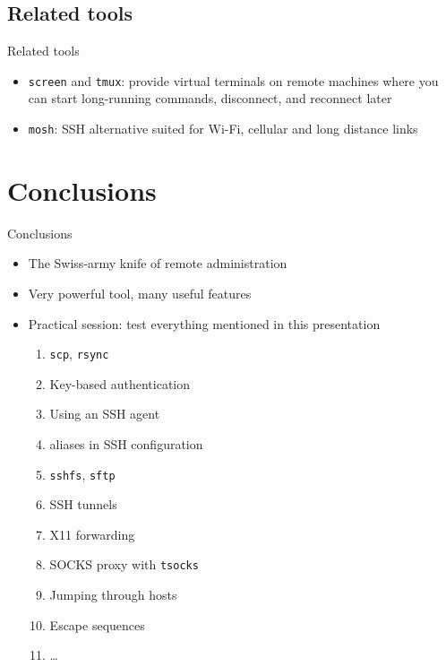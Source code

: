 \documentclass[11pt,final,usepdftitle=false]{beamer}
\begin{document}
\subsection{Related tools}
\begin{frame}{Related tools}
\begin{itemize}
\item \texttt{screen} and \texttt{tmux}: provide virtual terminals on remote
	machines where you can start long-running commands, disconnect, and
	reconnect later
	\hbr
\item \texttt{mosh}: SSH alternative suited for Wi-Fi, cellular and long distance links
\end{itemize}
\end{frame}

\section{Conclusions}
\begin{frame}{Conclusions}
	\begin{itemize}
		\item The Swiss-army knife of remote administration
			\hbr
		\item Very powerful tool, many useful features
			\hbr
		\item Practical session: test everything mentioned in this presentation
			\begin{enumerate}
				\item \texttt{scp}, \texttt{rsync}
				\item Key-based authentication
				\item Using an SSH agent
				\item aliases in SSH configuration
				\item \texttt{sshfs}, \texttt{sftp}
				\item SSH tunnels
				\item X11 forwarding
				\item SOCKS proxy with \texttt{tsocks}
				\item Jumping through hosts
				\item Escape sequences
				\item \ldots
			\end{enumerate}
	\end{itemize}
\end{frame}
\end{document}
